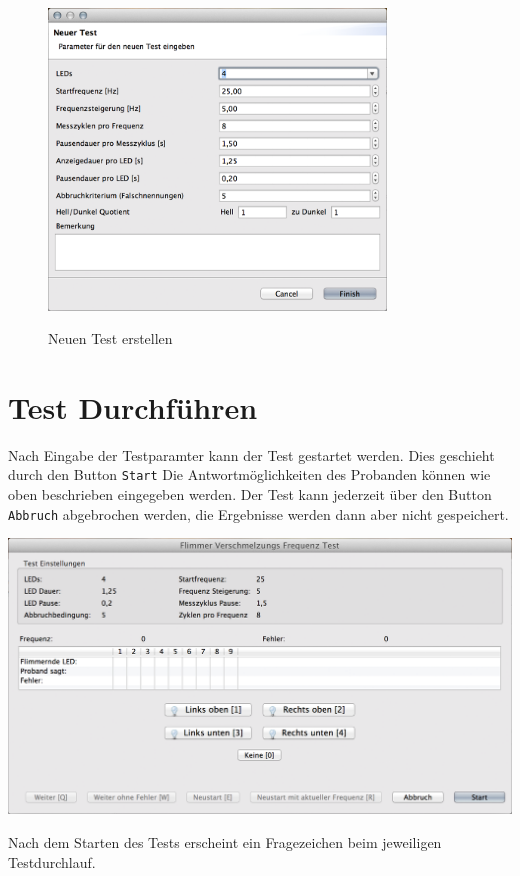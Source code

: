 \documentclass[11pt,accentcolor=tud2a,colorback,noheadingspace,bigchapter]{tudreport}
\begin{document}
\begin{figure}[H]
	\centering
	\includegraphics[width=0.8\textwidth]{test_dialog.png}
	\label{fig:test-new}
	\caption{Neuen Test erstellen}
\end{figure}

\section{Test Durchführen}
\label{tests:test-durchfuhren}\label{tests:test-run}
Nach Eingabe der Testparamter kann der Test gestartet werden. Dies geschieht durch den Button \texttt{Start} Die Antwortmöglichkeiten des Probanden können wie oben beschrieben eingegeben werden. Der Test kann jederzeit über den Button \texttt{Abbruch} abgebrochen werden, die Ergebnisse werden dann aber nicht gespeichert.

\includegraphics[width=\textwidth]{testrunner_dialog.png}

Nach dem Starten des Tests erscheint ein Fragezeichen beim jeweiligen Testdurchlauf.
\end{document}

